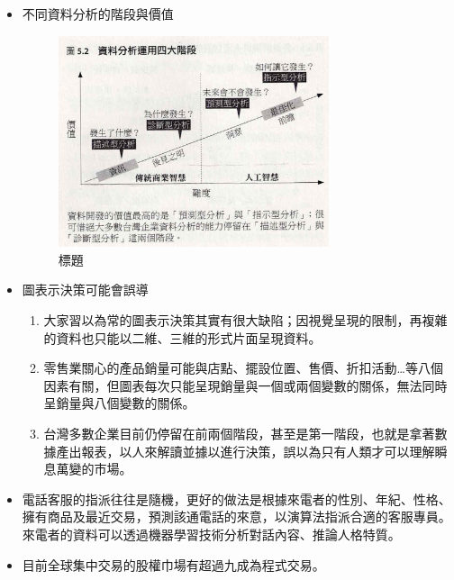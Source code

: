 \documentclass[a4paper,12pt]{article}
\begin{document}
\begin{itemize}
\begin{enumerate}
\end{enumerate}
\item 不同資料分析的階段與價值\\
\begin{figure}[htbp]
\centering
\includegraphics[width=300]{images/機器學習/2023-01-25_01-17-52_Scan 5.jpeg}
\caption{\label{fig:Name}標題}
\end{figure}
\item 圖表示決策可能會誤導\\
\begin{enumerate}
\item 大家習以為常的圖表示決策其實有很大缺陷；因視覺呈現的限制，再複雜的資料也只能以二維、三維的形式片面呈現資料。\\
\item 零售業關心的產品銷量可能與店點、擺設位置、售價、折扣活動\ldots{}等八個因素有關，但圖表每次只能呈現銷量與一個或兩個變數的關係，無法同時呈銷量與八個變數的關係。\\
\item 台灣多數企業目前仍停留在前兩個階段，甚至是第一階段，也就是拿著數據產出報表，以人來解讀並據以進行決策，誤以為只有人類才可以理解瞬息萬變的市場。\\
\end{enumerate}
\item 電話客服的指派往往是隨機，更好的做法是根據來電者的性別、年紀、性格、擁有商品及最近交易，預測該通電話的來意，以演算法指派合適的客服專員。來電者的資料可以透過機器學習技術分析對話內容、推論人格特質。\\
\item 目前全球集中交易的股權巾場有超過九成為程式交易。\\
\end{itemize}
\end{document}
